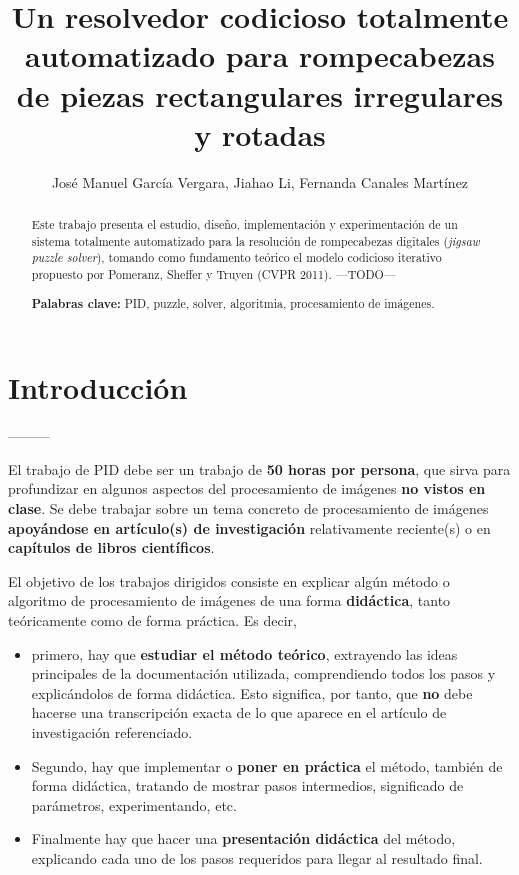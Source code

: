 \documentclass[a4paper]{article}
\title{Un resolvedor codicioso totalmente automatizado para rompecabezas de piezas rectangulares irregulares y rotadas}
\author{José Manuel García Vergara, Jiahao Li, Fernanda Canales Martínez}
\theoremstyle{plain} %
\theoremstyle{plain} %
\begin{document}
\maketitle

\begin{abstract}
\noindent Este trabajo presenta el estudio, diseño, implementación y experimentación de un sistema totalmente automatizado para la resolución de rompecabezas digitales
(\textit{jigsaw puzzle solver}), tomando como fundamento teórico el modelo codicioso iterativo propuesto por Pomeranz, Sheffer y Truyen (CVPR 2011).
---TODO---


\hspace{1cm}

\noindent \textbf{Palabras clave:} 
PID, puzzle, solver, algoritmia, procesamiento de imágenes.
\end{abstract}


\section{Introducción}


---------

El trabajo de PID debe ser un trabajo de {\bf 50 horas por persona}, que sirva para profundizar en algunos aspectos del procesamiento de imágenes {\bf no vistos en clase}. Se debe trabajar sobre un tema concreto de procesamiento de imágenes {\bf apoyándose en artículo(s) de investigación} relativamente reciente(s) o en {\bf capítulos de libros científicos}.

El objetivo de los trabajos dirigidos consiste en explicar algún método o algoritmo de procesamiento de imágenes de una forma {\bf didáctica}, tanto teóricamente como de forma práctica. Es decir, 
\begin{itemize}
    \item primero, hay que {\bf estudiar el método teórico}, extrayendo las ideas principales de la documentación utilizada, comprendiendo todos los pasos y explicándolos de forma didáctica. Esto significa, por tanto, que {\bf no} debe hacerse una transcripción exacta de lo que aparece en el artículo de investigación referenciado.
    \item Segundo, hay que implementar o {\bf poner en práctica} el método, también de forma didáctica, tratando de mostrar pasos intermedios, significado de parámetros, experimentando, etc.
    \item Finalmente hay que hacer una {\bf presentación didáctica} del método,  explicando cada uno de los pasos requeridos para llegar al resultado final.

\end{itemize}
\end{document}

